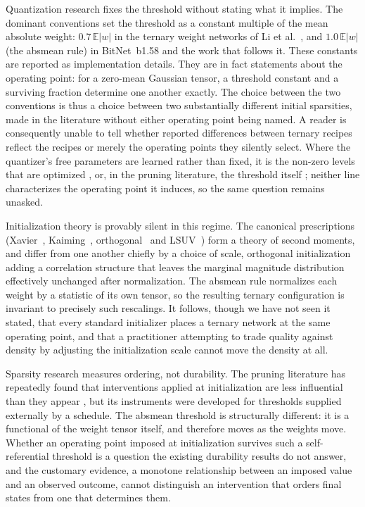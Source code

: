 \documentclass[final,5p,times,twocolumn]{elsarticle}
\theoremstyle{remark}
\newcommand{\E}{\mathbb{E}}
\begin{document}
Quantization research fixes the threshold without stating what it implies. The
dominant conventions set the threshold as a constant multiple of
the mean absolute weight: $0.7\,\E|w|$ in the ternary weight networks of
Li et al.~\cite{li2016}, and $1.0\,\E|w|$ (the absmean rule) in
BitNet~b1.58 \cite{ma2024} and the work that follows it. These constants are reported as
implementation details. They are in fact statements about the operating point:
for a zero-mean Gaussian tensor, a threshold constant and a surviving fraction
determine one another exactly. The choice between the two conventions is thus a
choice between two substantially different initial sparsities, made in the
literature without either operating point being named. A reader is consequently unable to
tell whether reported differences between ternary recipes reflect the recipes
or merely the operating points they silently select. Where the quantizer's free
parameters are learned rather than fixed, it is the non-zero levels that are
optimized \cite{zhu2017a}, or, in the pruning literature, the threshold
itself \cite{kusupati2020}; neither line characterizes the operating point
it induces, so the same question remains unasked.

Initialization theory is provably silent in this regime. The canonical
prescriptions (Xavier~\cite{glorot2010}, Kaiming~\cite{he2015},
orthogonal~\cite{saxe2014} and LSUV~\cite{mishkin2016}) form a theory of
second moments, and differ from one another chiefly by a choice of scale,
orthogonal initialization adding a correlation structure that leaves the
marginal magnitude distribution effectively unchanged after normalization. The
absmean rule normalizes each weight by a statistic of its own tensor, so the
resulting ternary configuration is invariant to precisely such rescalings. It
follows, though we have not seen it stated, that every standard initializer
places a ternary network at the same operating point, and that a practitioner
attempting to trade quality against density by adjusting the initialization
scale cannot move the density at all.

Sparsity research measures ordering, not durability. The pruning literature
has repeatedly found that interventions applied at initialization are less
influential than they appear \cite{frankle2021, frankle2020a}, but its
instruments were developed for thresholds supplied externally by a schedule.
The absmean threshold is structurally different: it is a functional of the
weight tensor itself, and therefore moves as the weights move. Whether an
operating point imposed at initialization survives such a self-referential
threshold is a question the existing durability results do not answer, and the
customary evidence, a monotone relationship between an imposed value and an
observed outcome, cannot distinguish an intervention that orders final states
from one that determines them.
\end{document}

